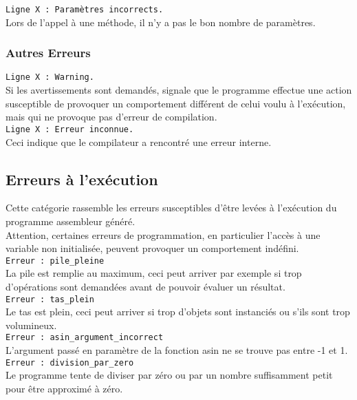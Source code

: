 \documentclass[12pt]{article}
\begin{document}
\lstinline!Ligne X : Paramètres incorrects.!\\
Lors de l'appel à une méthode, il n'y a pas le bon nombre de paramètres.\\

\subsubsection{Autres Erreurs}
\lstinline!Ligne X : Warning.!\\
Si les avertissements sont demandés, signale que le programme effectue une action
susceptible de provoquer un comportement différent de celui voulu à l'exécution, mais
qui ne provoque pas d'erreur de compilation.\\

\lstinline!Ligne X : Erreur inconnue.!\\
Ceci indique que le compilateur a rencontré une erreur interne.\\

\subsection{Erreurs à l'exécution}
Cette catégorie rassemble les erreurs susceptibles d'être levées à l'exécution du programme assembleur généré.\\
Attention, certaines erreurs de programmation, en particulier l'accès à une variable non
initialisée, peuvent provoquer un comportement indéfini.\\

\lstinline!Erreur : pile_pleine!\\
La pile est remplie au maximum, ceci peut arriver par exemple si trop d'opérations sont demandées avant de pouvoir évaluer un résultat.\\

\lstinline!Erreur : tas_plein!\\
Le tas est plein, ceci peut arriver si trop d'objets sont instanciés ou s'ils sont trop volumineux.\\

\lstinline!Erreur : asin_argument_incorrect!\\
L'argument passé en paramètre de la fonction asin ne se trouve pas entre -1 et 1.\\

\lstinline!Erreur : division_par_zero!\\
Le programme tente de diviser par zéro ou par un nombre suffisamment petit pour être approximé à zéro.\\
\end{document}
